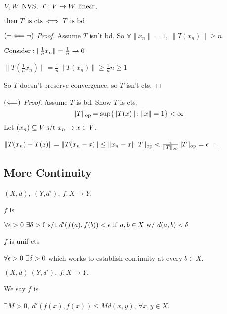 \documentclass[12pt]{article}
\begin{document}
\bboxprop
\begin{prop}
    \(V,W\ \TR{NVS},\ T:V\to W\ \TR{linear}\).

    \(\tthen\ T\ \is\ \TR{cts}\iff T\ \is\ \TR{bd}\)
\end{prop}
\ebox

\bboxproof
\begin{proof}[\((\neg\Longleftarrow\neg)\) Proof]
    Assume \(T\) isn't bd. So
    \(\forall\|x_n\|=1,\ \|T(x_n)\|\ge n\).

    \(\mathrm{Consider}: \|\frac1nx_n\|=\frac1n\to 0\)

    \(\|T(\frac1nx_n)\|=\frac1n\|T(x_n)\|\ge\frac1nn\ge1\)

    So \(T\) doesn't preserve convergence, so \(T\) isn't cts.
\end{proof}
\ebox

\bboxproof
\begin{proof}[\((\Longleftarrow)\) Proof]
    Assume \(T\) is bd. Show \(T\) is cts.
    \[
        \|T\|_{\mathrm{op}}=\sup\{\|T(x)\|:\|x\|=1\}<\infty
    \]
    Let \((x_n)\subseteq V\text{ s/t } x_n\to x\in V\).

    \(\|T(x_n) - T(x)\|=\|T(x_n-x)\|\le\|x_n-x\|\|T\|_{\mathrm{op}}<\frac{\epsilon}{\|T\|_{\mathrm{op}}}
    \|T\|_{\mathrm{op}}=\epsilon\)
\end{proof}
\ebox

\subsection{More Continuity}


\bboxdefn
\begin{defn}
    \((X,d),\ (Y,d'),\ f:X\to Y\).

    \(f\) is  

    \(\forall\e>0\ \exists\delta>0\st
    d'(f(a),f(b))<\e\ \iif\ a,b\in X\ \TR{w/}\ 
    d(a,b)<\delta\)
\end{defn}
\ebox

\bboxnote
\begin{note}
    \(f\) is unif cts 

    \(\forall\epsilon>0\ \exists\delta>0\) which works to establish
    continuity at every \(b\in X\).
\end{note}
\ebox

\bboxdefn
\begin{defn}[Lipschitz]
    \((X,d)\ (Y,d'),\ f:X\to Y.\)

    We say \(f\) is  

    \(\exists M>0,\ d'(f(x),f(x))\le Md(x,y),\ \forall x,y\in X\).
\end{defn}
\ebox
\end{document}
